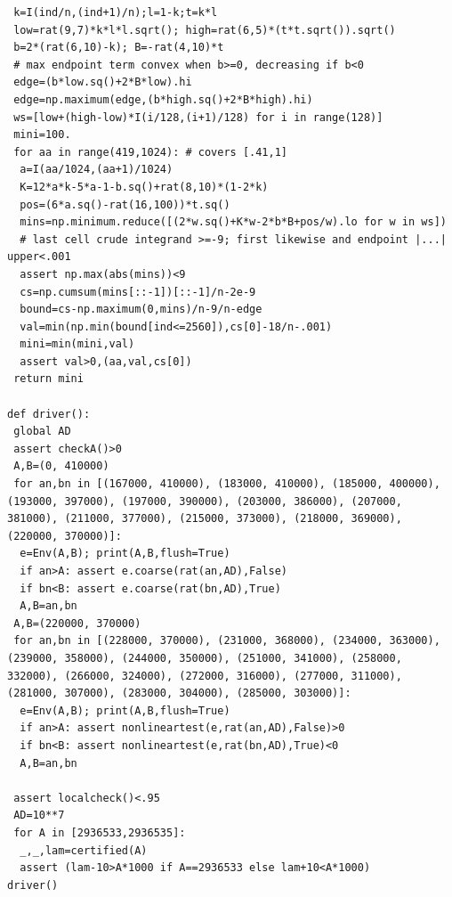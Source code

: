 \documentclass[11pt,a4paper]{article}
\numberwithin{equation}{section}
\theoremstyle{definition}
\theoremstyle{remark}
\begin{document}
\begin{lstlisting}
 k=I(ind/n,(ind+1)/n);l=1-k;t=k*l
 low=rat(9,7)*k*l*l.sqrt(); high=rat(6,5)*(t*t.sqrt()).sqrt()
 b=2*(rat(6,10)-k); B=-rat(4,10)*t
 # max endpoint term convex when b>=0, decreasing if b<0
 edge=(b*low.sq()+2*B*low).hi
 edge=np.maximum(edge,(b*high.sq()+2*B*high).hi)
 ws=[low+(high-low)*I(i/128,(i+1)/128) for i in range(128)]
 mini=100.
 for aa in range(419,1024): # covers [.41,1]
  a=I(aa/1024,(aa+1)/1024)
  K=12*a*k-5*a-1-b.sq()+rat(8,10)*(1-2*k)
  pos=(6*a.sq()-rat(16,100))*t.sq()
  mins=np.minimum.reduce([(2*w.sq()+K*w-2*b*B+pos/w).lo for w in ws])
  # last cell crude integrand >=-9; first likewise and endpoint |...| upper<.001
  assert np.max(abs(mins))<9
  cs=np.cumsum(mins[::-1])[::-1]/n-2e-9
  bound=cs-np.maximum(0,mins)/n-9/n-edge
  val=min(np.min(bound[ind<=2560]),cs[0]-18/n-.001)
  mini=min(mini,val)
  assert val>0,(aa,val,cs[0])
 return mini

def driver():
 global AD
 assert checkA()>0
 A,B=(0, 410000)
 for an,bn in [(167000, 410000), (183000, 410000), (185000, 400000), (193000, 397000), (197000, 390000), (203000, 386000), (207000, 381000), (211000, 377000), (215000, 373000), (218000, 369000), (220000, 370000)]:
  e=Env(A,B); print(A,B,flush=True)
  if an>A: assert e.coarse(rat(an,AD),False)
  if bn<B: assert e.coarse(rat(bn,AD),True)
  A,B=an,bn
 A,B=(220000, 370000)
 for an,bn in [(228000, 370000), (231000, 368000), (234000, 363000), (239000, 358000), (244000, 350000), (251000, 341000), (258000, 332000), (266000, 324000), (272000, 316000), (277000, 311000), (281000, 307000), (283000, 304000), (285000, 303000)]:
  e=Env(A,B); print(A,B,flush=True)
  if an>A: assert nonlineartest(e,rat(an,AD),False)>0
  if bn<B: assert nonlineartest(e,rat(bn,AD),True)<0
  A,B=an,bn

 assert localcheck()<.95
 AD=10**7
 for A in [2936533,2936535]:
  _,_,lam=certified(A)
  assert (lam-10>A*1000 if A==2936533 else lam+10<A*1000)
driver()
\end{lstlisting}
\end{document}

